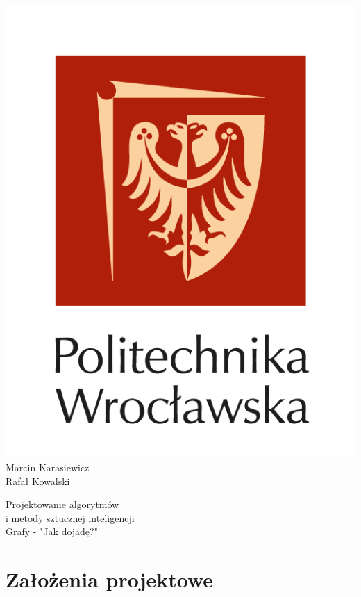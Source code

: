 \documentclass[13pt]{article}
\begin{document}
 
\begin{titlepage}
\begin{center}
\includegraphics[scale=1.0]{./Pwr_logo/logo_PWr_2.png}
\\
\vspace{1.5cm}
{\Huge Marcin Karasiewicz}\\
\vspace{0.5cm}
{\Huge Rafał Kowalski}
\\
\begin{Large}
\vspace{1.0cm}
Projektowanie algorytmów \\ i metody sztucznej inteligencji \\
\vspace{1.0cm}
Grafy - "Jak dojadę?"
\end{Large}
\end{center}
\newpage
\tableofcontents 
\end{titlepage}
\newpage

\section{Założenia projektowe}
\end{document}
